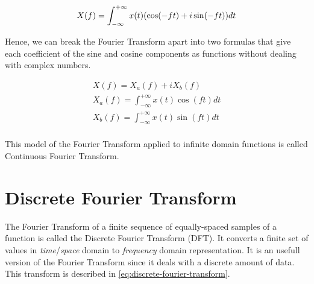 \documentclass[
  oneside,
  11pt, a4paper,
  footinclude=true,
  headinclude=true,
  cleardoublepage=empty
]{scrbook}
\begin{document}
\begin{equation} \label{eq:ft-with-euler}
    X(f) = \int_{-\infty}^{+\infty} x(t) (\cos (-f t) + i \sin (-f t)) dt \\
\end{equation}

Hence, we can break the Fourier Transform apart into two formulas that give each coefficient of the sine and cosine components as functions without dealing with complex numbers.

\begin{equation}
    \begin{split}
        X(f) = X_{a}(f) + i X_{b}(f) \\
        X_{a}(f) = \int_{-\infty}^{+\infty} x(t) \cos (f t) dt \\
        X_{b}(f) = \int_{-\infty}^{+\infty} x(t) \sin (f t) dt \\
    \end{split}
\end{equation}




This model of the Fourier Transform applied to infinite domain functions is called Continuous Fourier Transform. %


\section{Discrete Fourier Transform} \label{sec:discrete-fourier-transform}


The Fourier Transform of a finite sequence of equally-spaced samples of a function is called the Discrete Fourier Transform (DFT). It converts a finite set of values in \textit{time}/\textit{space} domain to \textit{frequency} domain representation. It is an usefull version of the Fourier Transform since it deals with a discrete amount of data. This transform is described in \autoref{eq:discrete-fourier-transform}.
\end{document}
